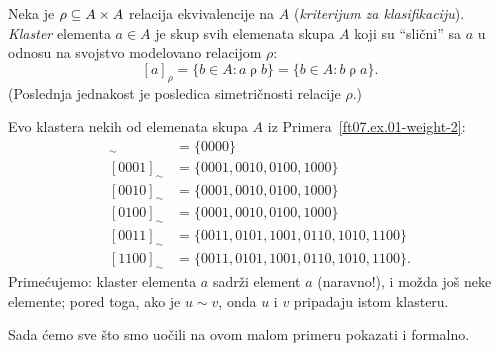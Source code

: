 \begin{DEF}
  Neka je $\mbox{$\rho$} \subseteq A \times A$ relacija ekvivalencije na $A$ (\emph{kriterijum za klasifikaciju}).
  \emph{Klaster} elementa $a \in A$ je skup svih elemenata skupa $A$ koji su \enquote{sli\v cni} sa $a$
  u odnosu na svojstvo modelovano relacijom $\rho$:
  $$
    [a]_\rho = \{ b \in A : a \mathrel{\rho} b \} = \{ b \in A : b \mathrel{\rho} a \}.
  $$
  (Poslednja jednakost je posledica simetri\v cnosti relacije $\rho$.)
\end{DEF}

\begin{EX}
  Evo klastera nekih od elemenata skupa $A$ iz Primera~\ref{ft07.ex.01-weight-2}:
  \begin{align*}
    [0000]_\sim &= \{0000\}\\
    [0001]_\sim &= \{0001, 0010, 0100, 1000\}\\
    [0010]_\sim &= \{0001, 0010, 0100, 1000\}\\
    [0100]_\sim &= \{0001, 0010, 0100, 1000\}\\
    [0011]_\sim &= \{0011, 0101, 1001, 0110, 1010, 1100\}\\
    [1100]_\sim &= \{0011, 0101, 1001, 0110, 1010, 1100\}.
  \end{align*}
  Prime\'cujemo: klaster elementa $a$ sadr\v zi element $a$ (naravno!), i mo\v zda jo\v s neke elemente;
  pored toga, ako je $u \sim v$, onda $u$ i $v$ pripadaju istom klasteru.
\end{EX}

Sada \'cemo sve \v sto smo uo\v cili na ovom malom primeru pokazati i formalno.

